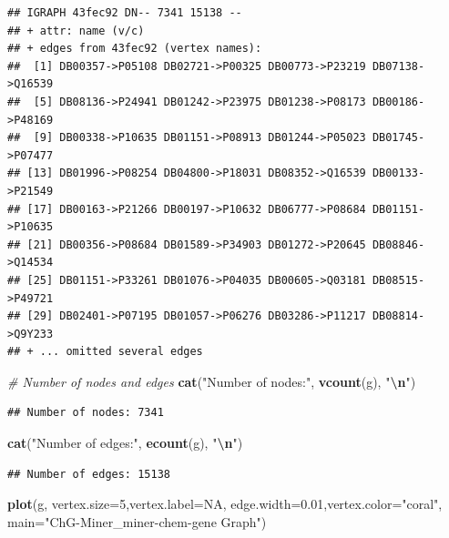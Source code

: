\documentclass[
]{article}
\newenvironment{Shaded}{\begin{snugshade}}{\end{snugshade}}
\newcommand{\AttributeTok}[1]{\textcolor[rgb]{0.13,0.29,0.53}{#1}}
\newcommand{\CommentTok}[1]{\textcolor[rgb]{0.56,0.35,0.01}{\textit{#1}}}
\newcommand{\ConstantTok}[1]{\textcolor[rgb]{0.56,0.35,0.01}{#1}}
\newcommand{\DecValTok}[1]{\textcolor[rgb]{0.00,0.00,0.81}{#1}}
\newcommand{\FloatTok}[1]{\textcolor[rgb]{0.00,0.00,0.81}{#1}}
\newcommand{\FunctionTok}[1]{\textcolor[rgb]{0.13,0.29,0.53}{\textbf{#1}}}
\newcommand{\NormalTok}[1]{#1}
\newcommand{\SpecialCharTok}[1]{\textcolor[rgb]{0.81,0.36,0.00}{\textbf{#1}}}
\newcommand{\StringTok}[1]{\textcolor[rgb]{0.31,0.60,0.02}{#1}}
\begin{document}
\begin{verbatim}
## IGRAPH 43fec92 DN-- 7341 15138 -- 
## + attr: name (v/c)
## + edges from 43fec92 (vertex names):
##  [1] DB00357->P05108 DB02721->P00325 DB00773->P23219 DB07138->Q16539
##  [5] DB08136->P24941 DB01242->P23975 DB01238->P08173 DB00186->P48169
##  [9] DB00338->P10635 DB01151->P08913 DB01244->P05023 DB01745->P07477
## [13] DB01996->P08254 DB04800->P18031 DB08352->Q16539 DB00133->P21549
## [17] DB00163->P21266 DB00197->P10632 DB06777->P08684 DB01151->P10635
## [21] DB00356->P08684 DB01589->P34903 DB01272->P20645 DB08846->Q14534
## [25] DB01151->P33261 DB01076->P04035 DB00605->Q03181 DB08515->P49721
## [29] DB02401->P07195 DB01057->P06276 DB03286->P11217 DB08814->Q9Y233
## + ... omitted several edges
\end{verbatim}

\begin{Shaded}
\begin{Highlighting}[]
\CommentTok{\# Number of nodes and edges}
\FunctionTok{cat}\NormalTok{(}\StringTok{"Number of nodes:"}\NormalTok{, }\FunctionTok{vcount}\NormalTok{(g), }\StringTok{"}\SpecialCharTok{\textbackslash{}n}\StringTok{"}\NormalTok{)}
\end{Highlighting}
\end{Shaded}

\begin{verbatim}
## Number of nodes: 7341
\end{verbatim}

\begin{Shaded}
\begin{Highlighting}[]
\FunctionTok{cat}\NormalTok{(}\StringTok{"Number of edges:"}\NormalTok{, }\FunctionTok{ecount}\NormalTok{(g), }\StringTok{"}\SpecialCharTok{\textbackslash{}n}\StringTok{"}\NormalTok{)}
\end{Highlighting}
\end{Shaded}

\begin{verbatim}
## Number of edges: 15138
\end{verbatim}

\begin{Shaded}
\begin{Highlighting}[]
\FunctionTok{plot}\NormalTok{(g, }\AttributeTok{vertex.size=}\DecValTok{5}\NormalTok{,}\AttributeTok{vertex.label=}\ConstantTok{NA}\NormalTok{, }\AttributeTok{edge.width=}\FloatTok{0.01}\NormalTok{,}\AttributeTok{vertex.color=}\StringTok{"coral"}\NormalTok{, }\AttributeTok{main=}\StringTok{"ChG{-}Miner\_miner{-}chem{-}gene Graph"}\NormalTok{)}
\end{Highlighting}
\end{Shaded}
\end{document}
